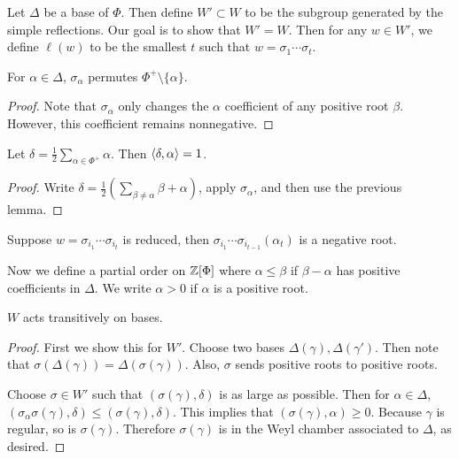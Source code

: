 \documentclass[twoside, 10pt]{article}
\begin{document}
    Let $\Delta$ be a base of $\Phi$. Then define $W' \subset W$ to be the subgroup generated by the simple reflections. Our goal is to show that $W' = W$. Then for any $w \in W'$, we define $\ell(w)$ to be the smallest $t$ such that $w = \sigma_1 \cdots \sigma_t$.

    \begin{lem}
        For $\alpha \in \Delta$, $\sigma_{\alpha}$ permutes $\Phi^+ \setminus \{\alpha\}$.
    \end{lem}

    \begin{proof}
        Note that $\sigma_{\alpha}$ only changes the $\alpha$ coefficient of any positive root $\beta$. However, this coefficient remains nonnegative.
    \end{proof}

    \begin{lem}
        Let $\delta = \frac{1}{2} \sum_{\alpha \in \Phi^+} \alpha$. Then $\langle\delta, \alpha\rangle = 1$.
    \end{lem}

    \begin{proof}
        Write $\delta = \frac{1}{2} \left( \sum_{\beta \neq \alpha} \beta + \alpha\right)$, apply $\sigma_{\alpha}$, and then use the previous lemma.
    \end{proof}

    \begin{lem}
        Suppose $w = \sigma_{i_1} \cdots \sigma_{i_t}$ is reduced, then $\sigma_{i_1} \cdots \sigma_{i_{t-1}}(\alpha_t)$ is a negative root.
    \end{lem}

    Now we define a partial order on $\mathbb{Z}[\Phi]$ where $\alpha \leq \beta$ if $\beta - \alpha$ has positive coefficients in $\Delta$. We write $\alpha > 0$ if $\alpha$ is a positive root.

    \begin{prop}
        $W$ acts transitively on bases.
    \end{prop}

    \begin{proof}
        First we show this for $W'$. Choose two bases $\Delta(\gamma), \Delta(\gamma')$. Then note that $\sigma(\Delta(\gamma)) = \Delta(\sigma(\gamma))$. Also, $\sigma$ sends positive roots to positive roots.

        Choose $\sigma \in W'$ such that $(\sigma(\gamma), \delta)$ is as large as possible. Then for $\alpha \in \Delta$, $(\sigma_{\alpha}\sigma(\gamma), \delta) \leq (\sigma(\gamma),\delta)$. This implies that $(\sigma(\gamma),\alpha) \geq 0$. Because $\gamma$ is regular, so is $\sigma(\gamma)$. Therefore $\sigma(\gamma)$ is in the Weyl chamber associated to $\Delta$, as desired.
    \end{proof}
\end{document}
